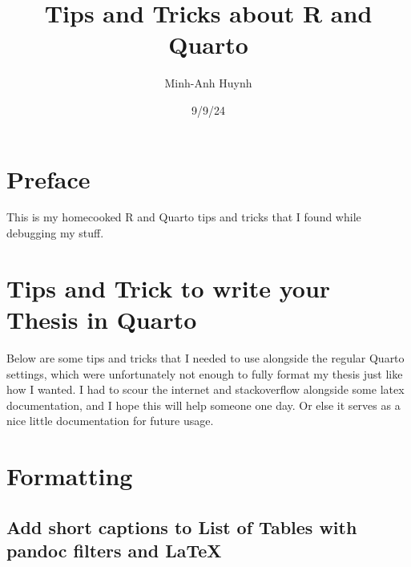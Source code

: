 \documentclass[
  letterpaper,
  DIV=11,
  numbers=noendperiod]{scrreprt}
\title{Tips and Tricks about R and Quarto}
\author{Minh-Anh Huynh}
\date{9/9/24}
\renewcommand*\contentsname{Table of contents}
\newcommand\contentsname{Table of contents}
\begin{document}
\maketitle
\ifdefined\Shaded\renewenvironment{Shaded}{\begin{tcolorbox}[boxrule=0pt, borderline west={3pt}{0pt}{shadecolor}, interior hidden, frame hidden, enhanced, sharp corners, breakable]}{\end{tcolorbox}}\fi

\renewcommand*\contentsname{Table of contents}
{
\hypersetup{linkcolor=}
\setcounter{tocdepth}{2}
\tableofcontents
}

\hypertarget{preface}{%
\chapter*{Preface}\label{preface}}


This is my homecooked R and Quarto tips and tricks that I found while
debugging my stuff.


\hypertarget{tips-and-trick-to-write-your-thesis-in-quarto}{%
\chapter{Tips and Trick to write your Thesis in
Quarto}\label{tips-and-trick-to-write-your-thesis-in-quarto}}

Below are some tips and tricks that I needed to use alongside the
regular Quarto settings, which were unfortunately not enough to fully
format my thesis just like how I wanted. I had to scour the internet and
stackoverflow alongside some latex documentation, and I hope this will
help someone one day. Or else it serves as a nice little documentation
for future usage.


\hypertarget{formatting}{%
\chapter{Formatting}\label{formatting}}

\hypertarget{add-short-captions-to-list-of-tables-with-pandoc-filters-and-latex}{%
\section{Add short captions to List of Tables with pandoc filters and
LaTeX}\label{add-short-captions-to-list-of-tables-with-pandoc-filters-and-latex}}
\end{document}
